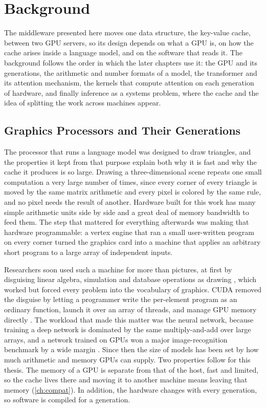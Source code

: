 \chapter{Background}
\label{ch:background}

The middleware presented here moves one data structure, the key-value cache,
between two GPU servers, so its design depends on what a GPU is, on how the
cache arises inside a language model, and on the software that reads it. The
background follows the order in which the later chapters use it: the GPU and
its generations, the arithmetic and number
formats of a model, the transformer and its attention mechanism, the kernels
that compute attention on each generation of hardware, and finally inference
as a systems problem, where the cache and the idea of splitting the work
across machines appear.

\section{Graphics Processors and Their Generations}
\label{ch:gpu}
\label{ch:gpugen}

The processor that runs a language model was designed to draw triangles, and
the properties it kept from that purpose explain both why it is fast and why
the cache it produces is so large. Drawing a three-dimensional scene repeats
one small computation a very large number of times, since every corner of
every triangle is moved by the same matrix arithmetic and every pixel is
colored by the same rule, and no pixel needs the result of another. Hardware
built for this work has many simple arithmetic units side by side and a great
deal of memory bandwidth to feed them. The step that mattered for everything
afterwards was making that hardware programmable: a vertex engine that ran a
small user-written program on every corner \citep{lindholm2001} turned the
graphics card into a machine that applies an arbitrary short program to a
large array of independent inputs.

Researchers soon used such a machine for more than pictures, at first by
disguising linear algebra, simulation and database operations as drawing
\citep{owens2007}, which worked but forced every problem into the vocabulary
of graphics. CUDA removed the disguise by letting a programmer write the
per-element program as an ordinary function, launch it over an array of
threads, and manage GPU memory directly \citep{nickolls2008}. The workload
that made this matter was the neural network, because training a deep network
is dominated by the same multiply-and-add over large arrays, and a network
trained on GPUs won a major image-recognition benchmark by a wide margin
\citep{krizhevsky2017}. Since then the size of models has been set by how
much arithmetic and memory GPUs can supply. Two properties follow for this
thesis. The memory of a GPU is separate from that of the host, fast and
limited, so the cache lives there and moving it to another machine means
leaving that memory (\cref{ch:compat}). In addition, the hardware changes
with every generation, so software is compiled for a generation.

